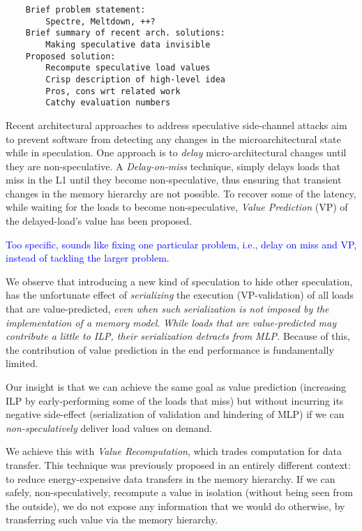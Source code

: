 \begin{verbatim}
    Brief problem statement: 
        Spectre, Meltdown, ++?
    Brief summary of recent arch. solutions: 
        Making speculative data invisible
    Proposed solution: 
        Recompute speculative load values
        Crisp description of high-level idea
        Pros, cons wrt related work
        Catchy evaluation numbers
\end{verbatim}

Recent architectural approaches to address speculative side-channel attacks aim to prevent software from detecting any changes %
in the microarchitectural state while in speculation. 
%
One approach is to \emph{delay} micro-architectural changes until they are non-speculative. A \emph{Delay-on-miss} technique, simply delays loads that miss in the L1 until they become non-speculative, thus ensuring that transient changes in the memory hierarchy are not possible.
%
To recover some of the latency, while waiting for the loads to become non-speculative, \emph{Value Prediction} (VP) of the delayed-load's value has been proposed.

\textcolor{blue}{Too specific, sounds like fixing one particular problem, i.e., delay on miss and VP, instead of tackling the larger problem.}

We observe that introducing a new kind of speculation to hide other speculation, has the unfortunate effect of \emph{serializing} the execution (VP-validation) of all loads that are value-predicted, \emph{even when such serialization is not imposed by the implementation of a memory model}. \emph{While loads that are value-predicted may contribute a little to ILP, their serialization detracts from MLP.} Because of this, the contribution of value prediction in the end performance is fundamentally limited.

Our insight is that we can achieve the same goal as value prediction (increasing ILP by early-performing some of the loads that miss) but without incurring its negative side-effect (serialization of validation and hindering of MLP) if we can \emph{non-speculatively} deliver load values on demand. 

We achieve this with \emph{Value Recomputation}, which trades computation for data transfer. This technique was previously proposed in an entirely different context: to reduce energy-expensive data transfers in the memory hierarchy. If we can safely, non-speculatively, recompute a value in isolation (without being seen from the outside), we do not expose any information that we would do otherwise, by transferring such value via the memory hierarchy.

